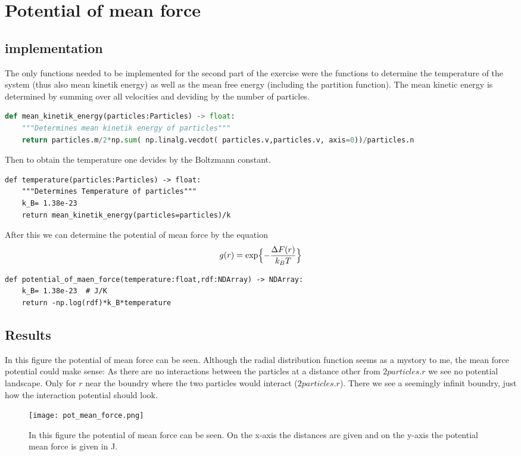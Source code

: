 \documentclass{article}[a4paper]
\begin{document}
\section{Potential of mean force}
\subsection{implementation}
The only functions needed to be implemented for the second part of the exercise were the functions to determine the temperature of the system (thus also mean kinetik energy) as well as the mean free energy (including the partition function).
The mean kinetic energy is determined by summing over all velocities and deviding by the number of particles.
\begin{lstlisting}[language=Python]
def mean_kinetik_energy(particles:Particles) -> float:
    """Determines mean kinetik energy of particles"""
    return particles.m/2*np.sum( np.linalg.vecdot( particles.v,particles.v, axis=0))/particles.n
\end{lstlisting}
Then to obtain the temperature one devides by the Boltzmann constant.
\begin{lstlisting}
def temperature(particles:Particles) -> float:
    """Determines Temperature of particles"""
    k_B= 1.38e-23  
    return mean_kinetik_energy(particles=particles)/k
\end{lstlisting}
After this we can determine the potential of mean force by the equation
\begin{equation}
    g(r)= \exp \Bigl\{-\frac{\Delta F(r)}{k_B T}\Bigr\}
\end{equation}
\begin{lstlisting}
def potential_of_maen_force(temperature:float,rdf:NDArray) -> NDArray:
    k_B= 1.38e-23  # J/K
    return -np.log(rdf)*k_B*temperature   
\end{lstlisting}

\subsection{Results}
In this figure the potential of mean force can be seen.
Although the radial distribution function seems as a mystory to me, the mean force potential could make sense: 
As there are no interactions between the particles at a distance other from $2\textit{particles.r}$ we see no potential landscape.
Only for $r$ near the boundry where the two particles would interact ($2\textit{particles.r}$).
There we see a seemingly infinit boundry, just how the interaction potential should look.
\begin{figure}
    \centering
    \texttt{[image: pot\_mean\_force.png]}
    \caption{In this figure the potential of mean force can be seen. On the x-axis the distances are given and on the y-axis the potential mean force is given in J.}
\end{figure}
\end{document}
